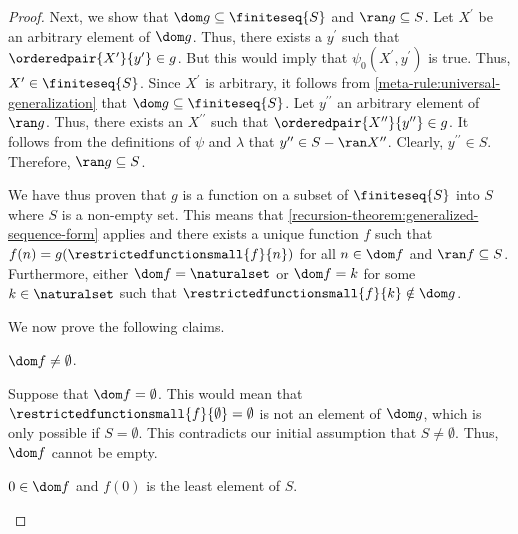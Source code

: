 \begin{proof}
    \vspace{0.3cm}
    \noindent
    Next, we show that \( \dom g \subseteq \finiteseq{S} \) and \( \ran g \subseteq S \).
    Let \( X^{\prime} \) be an arbitrary element of \( \dom g \).
    Thus, there exists a \( y^{\prime} \) such that \( \orderedpair{X^{\prime}}{y^{\prime}} \in g \).
    But this would imply that \( \psi_{0}(X^{\prime}, y^{\prime}) \) is true.
    Thus, \( X^{\prime} \in \finiteseq{S} \).
    Since \( X^{\prime} \) is arbitrary, it follows from \cref{meta-rule:universal-generalization} that \( \dom g \subseteq \finiteseq{S} \).
    Let \( y^{\prime\prime} \) an arbitrary element of \( \ran g \).
    Thus, there exists an \( X^{\prime\prime} \) such that \( \orderedpair{X^{\prime\prime}}{y^{\prime\prime}} \in g \).
    It follows from the definitions of \( \psi \) and \( \lambda \) that \( y^{\prime\prime} \in S - \ran X^{\prime\prime} \).
    Clearly, \( y^{\prime\prime} \in S \).
    Therefore, \( \ran g \subseteq S \).

    \vspace{0.3cm}
    \noindent
    We have thus proven that \( g \) is a function on a subset of \( \finiteseq{S} \) into \( S \) where \( S \) is a non-empty set.
    This means that \cref{recursion-theorem:generalized-sequence-form} applies and there exists a unique function \( f \) such that
    \( f(n) = g( \restrictedfunctionsmall{f}{n} ) \) for all \( n \in \dom f \) and \( \ran f \subseteq S \).
    Furthermore, either \( \dom f = \naturalset \) or \( \dom f = k \) for some \( k \in \naturalset \) such that \( \restrictedfunctionsmall{f}{k} \notin \dom g \).

    \vspace{0.3cm}
    \noindent
    We now prove the following claims.

    \begin{claim}
         \label{claim:dom-f-cannot-be-empty}
        \( \dom f \neq \emptyset \).
    \end{claim}
    \noindent
    Suppose that \( \dom f = \emptyset \).
    This would mean that \( \restrictedfunctionsmall{f}{\emptyset} = \emptyset \) is not an element of \( \dom g \), which is only possible
    if \( S = \emptyset \).
    This contradicts our initial assumption that \( S \neq \emptyset \).
    Thus, \( \dom f \) cannot be empty.

    \begin{claim}
         \label{claim:f-zero-equals-least-element-of-S}
        \( 0 \in \dom f \) and \( f(0) \) is the least element of \( S \).
    \end{claim}


\end{proof}
